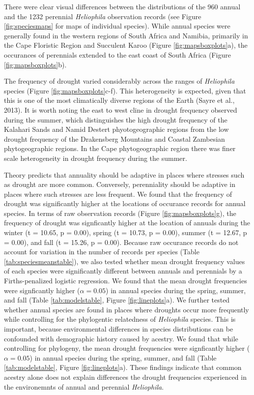 \documentclass[man,floatsintext]{apa6}
\theoremstyle{definition}
\theoremstyle{definition}
\theoremstyle{definition}
\theoremstyle{remark}
\begin{document}
There were clear visual differences between the distributions of the 960
annual and the 1232 perennial \emph{Heliophila} observation records (see
Figure \ref{fig:speciesmaps} for maps of individual species). While
annual species were generally found in the western regions of South
Africa and Namibia, primarily in the Cape Floristic Region and Succulent
Karoo (Figure \ref{fig:mapsboxplots}a), the occurances of perennials
extended to the east coast of South Africa (Figure
\ref{fig:mapsboxplots}b).

The frequency of drought varied considerably across the ranges of
\emph{Heliophila} species (Figure \ref{fig:mapsboxplots}c-f). This
heterogeneity is expected, given that this is one of the most
climatically diverse regions of the Earth (Sayre et al., 2013). It is
worth noting the east to west cline in drought frequency observed during
the summer, which distinguishes the high drought frequency of the
Kalahari Sands and Namid Destert phyotogeographic regions from the low
drought frequency of the Drakensberg Mountains and Coastal Zambesian
phytogeographic regions. In the Cape phytogeographic region there was
finer scale heterogeneity in drought frequency during the summer.

Theory predicts that annuality should be adaptive in places where
stresses such as drought are more common. Conversely, perenniality
should be adaptive in places where such stresses are less frequent. We
found that the frequency of drought was significantly higher at the
locations of occurance records for annual species. In terms of raw
observation records (Figure \ref{fig:mapsboxplots}g), the frequency of
drought was signficantly higher at the location of annuals during the
winter (t = 10.65, p = 0.00), spring (t = 10.73, p = 0.00), summer (t =
12.67, p = 0.00), and fall (t = 15.26, p = 0.00). Because raw occurance
records do not account for variation in the number of records per
species (Table \ref{tab:speciesmeanstable}), we also tested whether mean
drought frequency values of each species were significantly different
between annuals and perennials by a Firths-penalized logistic
regression. We found that the mean drought frequencies were signficantly
higher (\(\alpha = 0.05\)) in annual species during the spring, summer,
and fall (Table \ref{tab:modelstable}, Figure \ref{fig:lineplots}a). We
further tested whether annual species are found in places where droughts
occur more frequently while controlling for the phylogentic relatedness
of \emph{Heliophila} species. This is important, because environmental
differences in species distributions can be confounded with demographic
history caused by acestry. We found that while controlling for
phylogeny, the mean drought frequencies were signficantly higher
(\(\alpha = 0.05\)) in annual species during the spring, summer, and
fall (Table \ref{tab:modelstable}, Figure \ref{fig:lineplots}a). These
findings indicate that common acestry alone does not explain differences
the drought frequencies experienced in the environemnts of annual and
perennial \emph{Heliophila}.
\end{document}
